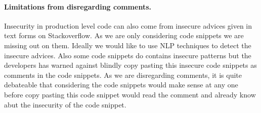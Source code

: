 \noindent
\paragraph{Limitations from disregarding comments.} Insecurity in production level code can also come from 
insecure advices given in text forms on Stackoverflow. 
As we are only considering code snippets we are missing out on them. 
Ideally we would like to use NLP techniques to detect the insecure advices. Also some code snippets do contains insecure patterns 
but the developers has warned against blindly copy pasting this insecure code snippets as comments in the code snippets. As we are disregarding
comments, it is quite debateable that considering the code snippets would make sense at any one before copy pasting this
code snippet would read the comment and already know abut the insecurity of the code snippet.     